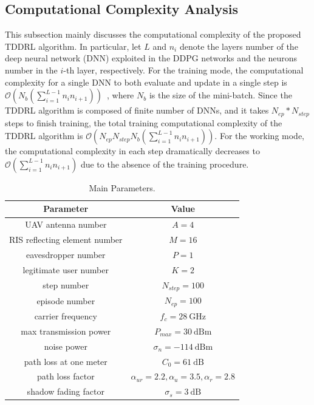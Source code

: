 \documentclass[12pt, draftclsnofoot, onecolumn]{IEEEtran}
\begin{document}
\subsection{Computational Complexity Analysis}
This subsection mainly discusses the computational complexity of the proposed TDDRL algorithm. In particular, let $L$ and $n_{i}$ denote the layers number of the deep neural network (DNN) exploited in the DDPG networks and the neurons number in the $i$-th layer, respectively. For the training mode, the computational complexity for a single DNN to both evaluate and update in a single step is ${\mathcal O}(N_{b}(\sum_{i=1}^{L-1} n_{i}n_{i+1})) $~\cite{secure-1}, where $N_{b}$ is the size of the mini-batch. Since the TDDRL algorithm is composed of finite number of DNNs, and it takes $N_{ep}*N_{step}$ steps to finish training, the total training computational complexity of the TDDRL algorithm is ${\mathcal O}(N_{ep}N_{step}N_{b}(\sum_{i=1}^{L-1} n_{i}n_{i+1})) $. For the working mode, the computational complexity in each step dramatically decreases to ${\mathcal O}(\sum_{i=1}^{L-1} n_{i}n_{i+1}) $ due to the absence of the training procedure.

\begin{table}[t]
  \centering
  \caption{Main Parameters.}
  \begin{tabular}{cc} 
  \toprule
  Parameter              & Value    \\ 
  \hline
  UAV antenna number    &${{A}}=4$        \\
  RIS reflecting element number &${ M}=16$       \\
  eavesdropper number    &${{P}} = 1$        \\
legitimate user number &${{K}} =2$        \\
  step number            & $N_{step}=100$      \\
  episode number         & $N_{ep}=100$      \\
  carrier frequency      &$f_c=28\ \text{GHz}$\\
  max transmission power            &$P_{max }= 30\ \text{dBm}$  \\
  noise power            &$\sigma_n= -114\ \text{dBm}$  \\
  path loss at one meter &$C_0=61\ \text{dB} $\\
  path loss factor\cite{parameters}       &    $\alpha_{ur}=2.2,\alpha_{u}=3.5,\alpha_{r}=2.8$      \\
  shadow   fading factor &${\sigma}_s = 3\ \text{dB} $     \\
  \bottomrule
  \end{tabular}
\end{table}
\end{document}
